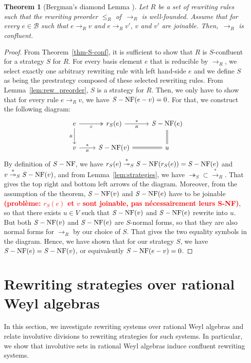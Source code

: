 \documentclass[11pt]{article}
\newtheorem{theorem}{Theorem}[section]
\theoremstyle{definition}
\newcommand\todo[1]{{\bf\textcolor{red}{#1}}}
\newcommand\basis{\mathscr{B}}
\newcommand\ordR{\leq_R}
\newcommand\rewR{\to_R}
\newcommand\parS{\twoheadrightarrow_S}
\newcommand\transR{\overset{*}{\to}_R}
\newcommand\transS{\overset{*}{\twoheadrightarrow}_S}
\DeclareMathOperator{\SNF}{{\it S}-NF}
\begin{document}
\begin{theorem}[Bergman's diamond Lemma \cite{MR506890}]\label{thm:diamond_lemma}
  Let $R$ be a set of rewriting rules such that the rewriting preorder
  $\ordR$ of~$\rewR$ is well-founded. Assume that  for every $e\in\basis$
  such that $e\rewR v$ and $e\rewR v'$, $v$ and $v'$ are joinable. 
  Then,~$\rewR$ is confluent.
\end{theorem}

\begin{proof}
  From Theorem~\ref{thm-S-conf}, it is sufficient to show that $R$ is
  $S$-confluent for a strategy $S$ for $R$. For every basis element $e$
  that is reducible by $\rewR$, we select exactly one arbitrary rewriting
  rule with left hand-side $e$ and we define $S$ as being the prestrategy
  composed of these selected rewriting rules. From
  Lemma~\ref{lem:rew_preorder}, $S$ is a strategy for $R$. Then, we only
  have to show that for every rule $e\rewR v$, we have $\SNF(e-v)=0$. For
  that, we construct the following diagram:
  \[\begin{tikzcd}
  e\ar[d, "_R"']\ar[r, twoheadrightarrow, "_S"'] & 
  r_S(e)\ar[r, "*", "_R"'] & \SNF(e)\ar[d, equal]\\
  v\ar[r, "*", "_R"'] & \SNF(v)\ar[r, equal] & u
\end{tikzcd}\] By definition of $\SNF$, we have
$r_S(e)\transS\SNF(r_S(e))=\SNF(e)$ and $v\transS\SNF(v)$, and from
Lemma~\ref{lem:strategies}, we have $\parS\subset\transR$. That gives the top right
and bottom left arrows of the diagram. Moreover, from the assumption of the
theorem, $\SNF(v)$ and $\SNF(e)$ have to be joinable \todo{(probl\`eme: $r_S(e)$
  et $v$ sont joinable, pas nécessairement leurs S-NF)}, so that there exists
$u\in V$ such that $\SNF(v)$ and $\SNF(e)$ rewrite into $u$. But both $\SNF(v)$
and $\SNF(e)$ are $S$-normal forms, so that they are also normal forms for
$\rewR$ by our choice of $S$. That gives the two equality symbols in the
diagram. Hence, we have shown that for our strategy $S$, we have
$\SNF(e)=\SNF(v)$, or equivalently $\SNF(e-v)=0$.
\end{proof}

\section{Rewriting strategies over rational Weyl algebras}
\label{sec:rewriting_strategies_over_rational_Weyl_algebras}

In this section, we investigate rewriting systems over rational Weyl
algebras and relate involutive divisions to rewriting strategies for such
systems. In particular, we show that involutive sets in rational Weyl
algebras induce confluent rewriting systems.
\medskip
\end{document}
